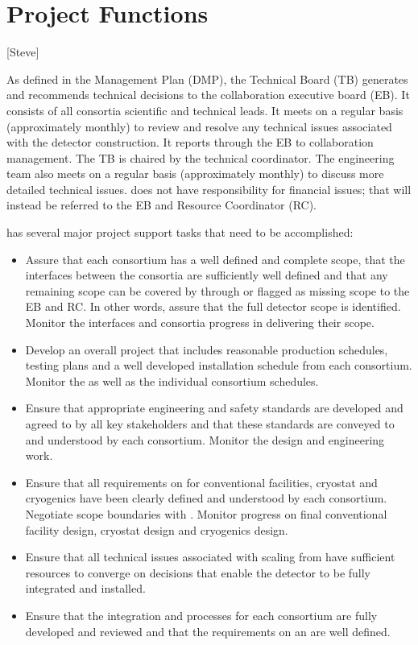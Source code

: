 \chapter{Project Functions}
\label{vl:tc-project}

[Steve]

As defined in the  Management Plan (DMP), the 
Technical Board (TB) generates and recommends technical decisions to the
collaboration executive board (EB).
It consists of all consortia scientific and technical leads. It meets
on a regular basis (approximately monthly) to review and resolve any
technical issues associated with the detector construction. It reports
through the EB to collaboration management. The  TB
is chaired by the technical coordinator. The
 engineering team also meets on a regular basis (approximately monthly)
to discuss more detailed technical issues.  does not have
responsibility for financial issues; that will instead be referred to
the EB and Resource Coordinator (RC).

 has several major project support tasks that need to be accomplished:
\begin{itemize}
\item Assure that each consortium has a well defined and complete
  scope, that the interfaces between the consortia are sufficiently
  well defined and that any remaining scope can be covered by 
  through  or flagged as missing scope to the EB and RC. In
  other words, assure that the full detector scope is
  identified. Monitor the interfaces and consortia progress in
  delivering their scope.
\item Develop an overall project 
  that includes reasonable production schedules, testing plans and a
  well developed installation schedule from each consortium. Monitor
  the  as well as the individual consortium schedules.
\item Ensure that appropriate engineering and safety standards are
  developed and agreed to by all key stakeholders and that these
  standards are conveyed to and understood by each
  consortium. Monitor the design and engineering work.
\item Ensure that all  requirements on  for
  conventional facilities, cryostat and cryogenics have been clearly
  defined and understood by each consortium. Negotiate scope
  boundaries with . Monitor  progress on
  final conventional facility design, cryostat design and cryogenics
  design.
\item Ensure that all technical issues associated with scaling from
   have sufficient resources to converge on
  decisions that enable the detector to be fully integrated and
  installed.
\item Ensure that the integration and  processes for each
  consortium are fully developed and reviewed and that the
  requirements on an  are well defined.
\end{itemize}

